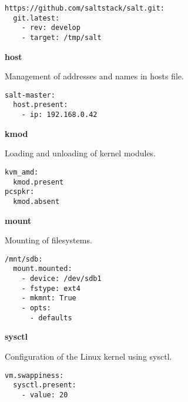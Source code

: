 \documentclass[landscape,a4paper,10pt]{article}
\begin{document}
\begin{multicols}{3}
\begin{verbatim}
https://github.com/saltstack/salt.git:
  git.latest:
    - rev: develop
    - target: /tmp/salt
\end{verbatim}

\bfseries{\LARGE{host}}

Management of addresses and names in hosts file.

\begin{verbatim}
salt-master:
  host.present:
    - ip: 192.168.0.42
\end{verbatim}

\bfseries{\LARGE{kmod}}

Loading and unloading of kernel modules.

\begin{verbatim}
kvm_amd:
  kmod.present
pcspkr:
  kmod.absent
\end{verbatim}

\bfseries{\LARGE{mount}}

Mounting of filesystems.

\begin{verbatim}
/mnt/sdb:
  mount.mounted:
    - device: /dev/sdb1
    - fstype: ext4
    - mkmnt: True
    - opts:
      - defaults
\end{verbatim}

\bfseries{\LARGE{sysctl}}

Configuration of the Linux kernel using sysctl.

\begin{verbatim}
vm.swappiness:
  sysctl.present:
    - value: 20
\end{verbatim}

\end{multicols}
\end{document}
